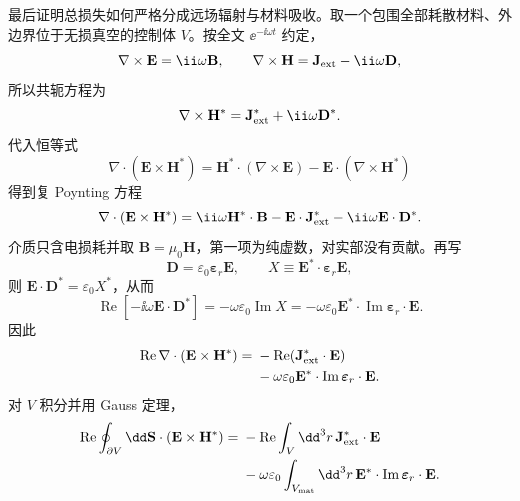 \begin{derivation}
最后证明总损失如何严格分成远场辐射与材料吸收。取一个包围全部耗散材料、外边界位于无损真空的控制体 $V$。按全文 $\ee^{-\ii\omega t}$ 约定，
\begin{equation*}
 \nabla\times\mathbf E=\ii\omega\mathbf B,
 \qquad
 \nabla\times\mathbf H=\mathbf J_{\rm ext}-\ii\omega\mathbf D,
\end{equation*}
所以共轭方程为
\begin{equation*}
 \nabla\times\mathbf H^*=\mathbf J_{\rm ext}^*+\ii\omega\mathbf D^*.
\end{equation*}
代入恒等式
\begin{equation*}
 \nabla\cdot(\mathbf E\times\mathbf H^*)
 =\mathbf H^*\cdot(\nabla\times\mathbf E)
 -\mathbf E\cdot(\nabla\times\mathbf H^*)
\end{equation*}
得到复 Poynting 方程
\begin{equation*}
 \nabla\cdot(\mathbf E\times\mathbf H^*)
 =\ii\omega\mathbf H^*\cdot\mathbf B
 -\mathbf E\cdot\mathbf J_{\rm ext}^*
 -\ii\omega\mathbf E\cdot\mathbf D^*.
\end{equation*}
介质只含电损耗并取 $\mathbf B=\mu_0\mathbf H$，第一项为纯虚数，对实部没有贡献。再写
\begin{equation*}
 \mathbf D=\varepsilon_0\boldsymbol\varepsilon_r\mathbf E,
 \qquad
 X\equiv\mathbf E^*\cdot\boldsymbol\varepsilon_r\mathbf E,
\end{equation*}
则 $\mathbf E\cdot\mathbf D^*=\varepsilon_0X^*$，从而
\begin{equation*}
 \operatorname{Re}[-\ii\omega\mathbf E\cdot\mathbf D^*]
 =-\omega\varepsilon_0\operatorname{Im}X
 =-\omega\varepsilon_0
 \mathbf E^*\cdot\operatorname{Im}\boldsymbol\varepsilon_r\cdot\mathbf E.
\end{equation*}
因此
\begin{align*}
 \operatorname{Re}\nabla\cdot(\mathbf E\times\mathbf H^*)
 ={}&-\operatorname{Re}(\mathbf J_{\rm ext}^*\cdot\mathbf E)\\
 &-\omega\varepsilon_0
 \mathbf E^*\cdot\operatorname{Im}\boldsymbol\varepsilon_r\cdot\mathbf E.
\end{align*}
对 $V$ 积分并用 Gauss 定理，
\begin{align*}
 \operatorname{Re}\oint_{\partial V}\dd\mathbf S\cdot
 (\mathbf E\times\mathbf H^*)
 ={}&-\operatorname{Re}\int_V\dd^3r\,
 \mathbf J_{\rm ext}^*\cdot\mathbf E\\
 &-\omega\varepsilon_0\int_{V_{\rm mat}}\dd^3r\,
 \mathbf E^*\cdot\operatorname{Im}\boldsymbol\varepsilon_r\cdot\mathbf E.
\end{align*}

\end{derivation}
